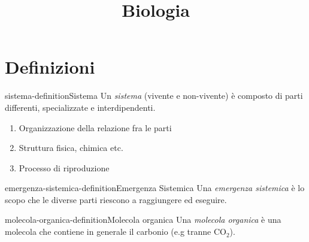 \documentclass[preview]{standalone}
\begin{document}
\title{Biologia}
\genpage

\section{Definizioni}

\begin{snippetdefinition}{sistema-definition}{Sistema}
    Un \textit{sistema} (vivente e non-vivente) è composto di parti differenti, specializzate e interdipendenti. 
    
    \begin{enumerate}
        \item Organizzazione della relazione fra le parti
        \item Struttura fisica, chimica etc. 
        \item Processo di riproduzione
    \end{enumerate}
\end{snippetdefinition}

\begin{snippetdefinition}{emergenza-sistemica-definition}{Emergenza Sistemica}
    Una \textit{emergenza sistemica} è lo scopo che le diverse parti riescono a raggiungere ed eseguire.
\end{snippetdefinition}


\begin{snippetdefinition}{molecola-organica-definition}{Molecola organica}
    Una \textit{molecola organica} è una molecola che contiene in generale il carbonio (e.g tranne CO\({}_2\)).
\end{snippetdefinition}
\end{document}
